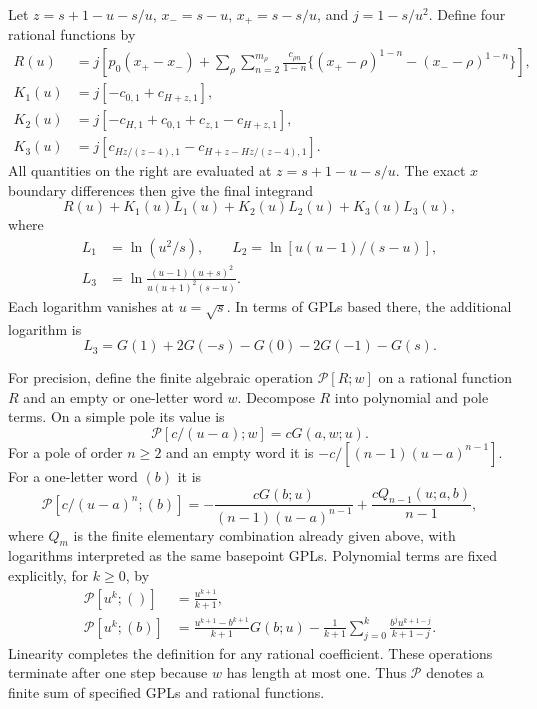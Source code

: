 Let $z=s+1-u-s/u$, $x_-=s-u$, $x_+=s-s/u$, and
$j=1-s/u^2$. Define four rational functions by
\begin{align}
 R(u)&=j\left[p_0(x_+-x_-)
  +\sum_{\rho}\sum_{n=2}^{m_\rho}
      \frac{c_{\rho n}}{1-n}
       \{(x_+-\rho)^{1-n}-(x_--\rho)^{1-n}\}\right],\\
 K_1(u)&=j[-c_{0,1}+c_{H+z,1}],\\
 K_2(u)&=j[-c_{H,1}+c_{0,1}+c_{z,1}-c_{H+z,1}],\\
 K_3(u)&=j[c_{Hz/(z-4),1}-c_{H+z-Hz/(z-4),1}].
\end{align}
All quantities on the right are evaluated at $z=s+1-u-s/u$.
The exact $x$ boundary differences then give the final integrand
\begin{equation}
 R(u)+K_1(u)L_1(u)+K_2(u)L_2(u)+K_3(u)L_3(u),
\end{equation}
where
\begin{align}
 L_1&=\ln(u^2/s),\qquad
 L_2=\ln[u(u-1)/(s-u)],\\
 L_3&=\ln\frac{(u-1)(u+s)^2}{u(u+1)^2(s-u)}.
\end{align}
Each logarithm vanishes at $u=\sqrt{s}$. In terms of GPLs based
there, the additional logarithm is
\begin{equation}
 L_3=G(1)+2G(-s)-G(0)-2G(-1)-G(s).
\end{equation}

For precision, define the finite algebraic operation
$\mathcal P[R;w]$ on a rational function $R$ and an empty or
one-letter word $w$. Decompose $R$ into polynomial and pole terms.
On a simple pole its value is
\begin{equation}
 \mathcal P[c/(u-a);w]=cG(a,w;u).
\end{equation}
For a pole of order $n\geq2$ and an empty word it is
$-c/[(n-1)(u-a)^{n-1}]$. For a one-letter word $(b)$ it is
\begin{equation}
 \mathcal P[c/(u-a)^n;(b)]
 =-\frac{cG(b;u)}{(n-1)(u-a)^{n-1}}
                  +\frac{cQ_{n-1}(u;a,b)}{n-1},
\end{equation}
where $Q_m$ is the finite elementary combination already given
above, with logarithms interpreted as the same basepoint GPLs.
Polynomial terms are fixed explicitly, for $k\geq0$, by
\begin{align}
 \mathcal P[u^k;()]&=\frac{u^{k+1}}{k+1},\\
 \mathcal P[u^k;(b)]&=\frac{u^{k+1}-b^{k+1}}{k+1}G(b;u)
  -\frac1{k+1}\sum_{j=0}^k
        \frac{b^j u^{k+1-j}}{k+1-j}.
\end{align}
Linearity completes the definition for any rational coefficient.
These operations terminate after one
step because $w$ has length at most one. Thus $\mathcal P$ denotes
a finite sum of specified GPLs and rational functions.

